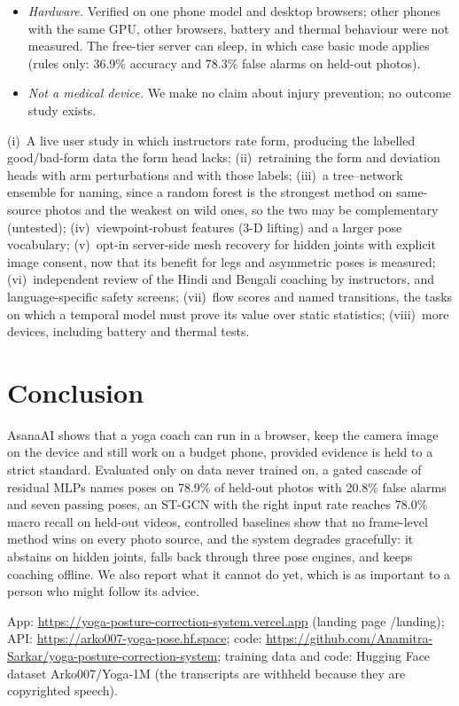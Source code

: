 \begin{itemize}
\item \emph{Hardware.} Verified on one phone model and desktop browsers; other phones with the same GPU, other browsers, battery and thermal behaviour were not measured. The free-tier server can sleep, in which case basic mode applies (rules only: 36.9\% accuracy and 78.3\% false alarms on held-out photos).
\item \emph{Not a medical device.} We make no claim about injury prevention; no outcome study exists.
\end{itemize}

 (i)~A live user study in which instructors rate form, producing the labelled good/bad-form data the form head lacks; (ii)~retraining the form and deviation heads with arm perturbations and with those labels; (iii)~a tree--network ensemble for naming, since a random forest is the strongest method on same-source photos and the weakest on wild ones, so the two may be complementary (untested); (iv)~viewpoint-robust features (3-D lifting) and a larger pose vocabulary; (v)~opt-in server-side mesh recovery for hidden joints with explicit image consent, now that its benefit for legs and asymmetric poses is measured; (vi)~independent review of the Hindi and Bengali coaching by instructors, and language-specific safety screens; (vii)~flow scores and named transitions, the tasks on which a temporal model must prove its value over static statistics; (viii)~more devices, including battery and thermal tests.

\section{Conclusion}
AsanaAI shows that a yoga coach can run in a browser, keep the camera image on the device and still work on a budget phone, provided evidence is held to a strict standard. Evaluated only on data never trained on, a gated cascade of residual MLPs names poses on 78.9\% of held-out photos with 20.8\% false alarms and seven passing poses, an ST-GCN with the right input rate reaches 78.0\% macro recall on held-out videos, controlled baselines show that no frame-level method wins on every photo source, and the system degrades gracefully: it abstains on hidden joints, falls back through three pose engines, and keeps coaching offline. We also report what it cannot do yet, which is as important to a person who might follow its advice.

 App: \url{https://yoga-posture-correction-system.vercel.app} (landing page /landing); API: \url{https://arko007-yoga-pose.hf.space}; code: \url{https://github.com/Anamitra-Sarkar/yoga-posture-correction-system}; training data and code: Hugging Face dataset Arko007/Yoga-1M (the transcripts are withheld because they are copyrighted speech).
